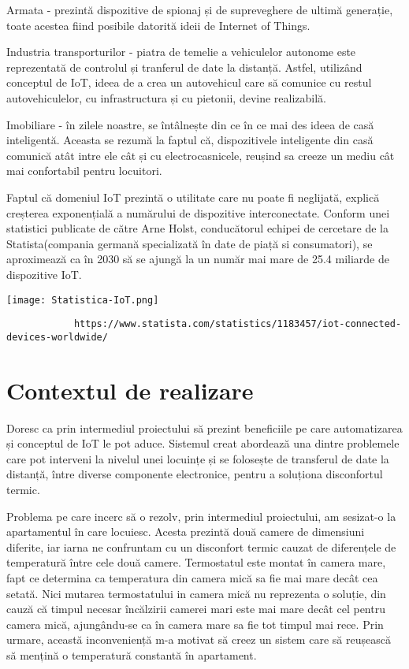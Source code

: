 	Armata - prezintă dispozitive de spionaj și de supreveghere de ultimă generație, toate acestea fiind posibile datorită ideii de Internet of Things.

	Industria transporturilor - piatra de temelie a vehiculelor autonome este reprezentată de controlul și tranferul de date la distanță. Astfel, utilizând conceptul de IoT, ideea de a crea un autovehicul care să comunice cu restul autovehiculelor, cu infrastructura și cu pietonii, devine realizabilă.

	Imobiliare - în zilele noastre, se întâlnește din ce în ce mai des ideea de casă inteligentă. Aceasta se rezumă la faptul că, dispozitivele inteligente din casă comunică atât intre ele cât și cu electrocasnicele, reușind sa creeze un mediu cât mai confortabil pentru locuitori.

	Faptul că domeniul IoT prezintă o utilitate care nu poate fi neglijată, explică creșterea exponențială a numărului de dispozitive interconectate. Conform unei statistici publicate de către Arne Holst, conducătorul echipei de cercetare de la Statista(compania germană specializată în date de piață si consumatori), se aproximează ca în 2030 să se ajungă la un număr mai mare de 25.4 miliarde de dispozitive IoT.

\bigskip
\begin{center}
    \texttt{[image: Statistica-IoT.png]}
    \begingroup
    	\fontsize{10pt}{12pt}\selectfont
    	\begin{verbatim}  
      		https://www.statista.com/statistics/1183457/iot-connected-devices-worldwide/
    	\end{verbatim}  
    \endgroup
\end{center}


\section{Contextul de realizare}\label{sec:context}
	Doresc ca prin intermediul proiectului să prezint beneficiile pe care automatizarea și conceptul de IoT le pot aduce. Sistemul creat abordează una dintre problemele care pot interveni la nivelul unei locuințe și se folosește de transferul de date la distanță, între diverse componente electronice, pentru a soluționa disconfortul termic.

	Problema pe care incerc să o rezolv, prin intermediul proiectului, am sesizat-o la apartamentul în care locuiesc. Acesta prezintă două camere de dimensiuni diferite, iar iarna ne confruntam cu un disconfort termic cauzat de diferențele de temperatură între cele două camere. Termostatul este montat în camera mare, fapt ce determina ca temperatura din camera mică sa fie mai mare decât cea setată. Nici mutarea termostatului in camera mică nu reprezenta o soluție, din cauză că timpul necesar încălzirii camerei mari este mai mare decât cel pentru camera mică, ajungându-se ca în camera mare sa fie tot timpul mai rece. Prin urmare, această inconveniență m-a motivat să creez un sistem care să reușească să mențină o temperatură constantă în apartament.

